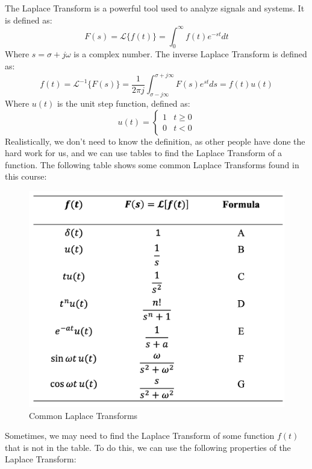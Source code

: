 \documentclass{article}
\theoremstyle{mytheoremstyle}
\theoremstyle{mytheoremstyle}
\theoremstyle{myproblemstyle}
\theoremstyle{break}
\begin{document}
The Laplace Transform is a powerful tool used to analyze signals and systems.
It is defined as:
\begin{equation}
	F(s) = \mathcal{L}\{f(t)\} = \int_0^\infty f(t)e^{-st}dt
\end{equation}
Where $s = \sigma + j\omega$ is a complex number.
The inverse Laplace Transform is defined as:
\begin{equation}
	f(t) = \mathcal{L}^{-1}\{F(s)\} = \frac{1}{2\pi j} \int_{\sigma-j\infty}^{\sigma+j\infty} F(s)e^{st}ds = f(t) u(t)
\end{equation}
Where $u(t)$ is the unit step function, defined as:
\begin{equation}
	u(t) = \begin{cases}
		1 & t \geq 0 \\
		0 & t < 0
	\end{cases}
\end{equation}
Realistically, we don't need to know the definition, as other people have done the hard work for us, and we can use tables to find the Laplace Transform of a function.
The following table shows some common Laplace Transforms found in this course:
\begin{figure}[h]
	\includegraphics[scale=0.2]{Laplace Transforms Table}
	\centering
	\caption{Common Laplace Transforms}
\end{figure}
\newpage
Sometimes, we may need to find the Laplace Transform of some function $f(t)$ that is not in the table. To do this, we can use the following properties of the Laplace Transform:
\end{document}
